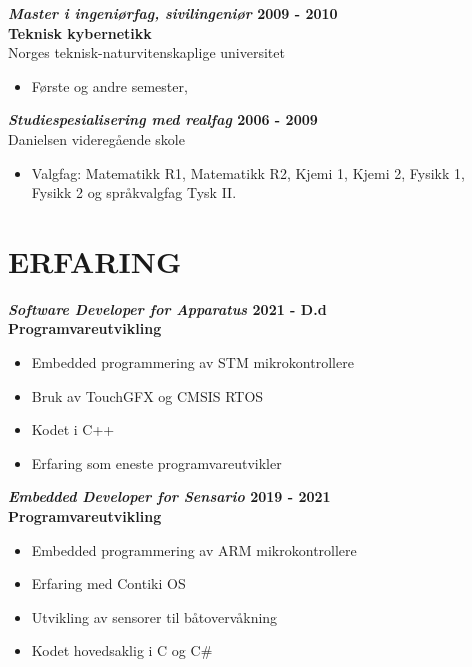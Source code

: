 \documentclass[margin, 10pt, norsk]{res} %
\begin{document}
\begin{resume}
\textbf{\emph{Master i ingeniørfag, sivilingeniør} \hfill 2009 - 2010
\\Teknisk kybernetikk } \\
Norges teknisk-naturvitenskaplige universitet
\begin{itemize} \itemsep -2pt %
\item Første og andre semester,
\end{itemize}

\textbf{\emph{Studiespesialisering med realfag }\hfill 2006 - 2009\\}
Danielsen videregående skole
\begin{itemize} \itemsep -2pt %
\item Valgfag: Matematikk R1, Matematikk R2, Kjemi 1, Kjemi 2, Fysikk 1,\\Fysikk 2 og språkvalgfag Tysk II.
\end{itemize}

\newpage

\hspace{5mm}  

\section{ERFARING}

\textbf{\emph{Software Developer for Apparatus} \hfill 2021 - D.d\\
	Programvareutvikling}

\begin{itemize} \itemsep -2pt %
	\item Embedded programmering av STM mikrokontrollere
	\item Bruk av TouchGFX og CMSIS RTOS
	\item Kodet i C++
	\item Erfaring som eneste programvareutvikler
\end{itemize}

\textbf{\emph{Embedded Developer for Sensario} \hfill 2019 - 2021\\
	Programvareutvikling}

\begin{itemize} \itemsep -2pt %
	\item Embedded programmering av ARM mikrokontrollere
	\item Erfaring med Contiki OS
	\item Utvikling av sensorer til båtovervåkning
	\item Kodet hovedsaklig i C og C\#
\end{itemize}


\end{resume}
\end{document}
